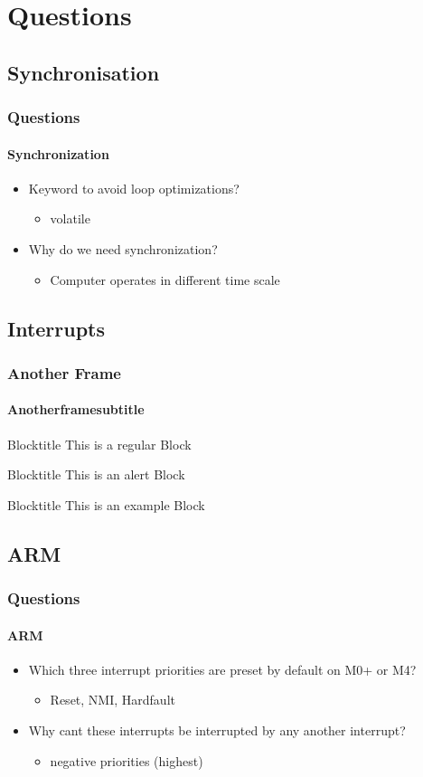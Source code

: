 \section{Questions}
\subsection{Synchronisation}
\begin{frame}
    \frametitle{Questions}
    \framesubtitle{Synchronization}
    \begin{itemize}
        \item Keyword to avoid loop optimizations?
        \begin{itemize}
        	\item volatile
        \end{itemize}
        \item Why do we need synchronization?
        \begin{itemize}
        	\item Computer operates in different time scale
        \end{itemize}
    \end{itemize}
\end{frame}

\subsection{Interrupts}
\begin{frame}
    \frametitle{Another Frame}
    \framesubtitle{Anotherframesubtitle}
    \begin{block}{Blocktitle}
        This is a regular Block
    \end{block}
    \begin{alertblock}{Blocktitle}
        This is an alert Block
    \end{alertblock}
    \begin{exampleblock}{Blocktitle}
        This is an example Block
    \end{exampleblock}
\end{frame}

\subsection{ARM}
\begin{frame}
    \frametitle{Questions}
    \framesubtitle{ARM}
    \begin{itemize}
        \item Which three interrupt priorities are preset by default on M0+ or M4?
        \begin{itemize}
        	\item Reset, NMI, Hardfault
        \end{itemize}
        \item Why cant these interrupts be interrupted by any another interrupt?
        \begin{itemize}
        	\item negative priorities (highest)
        \end{itemize}
    \end{itemize}
\end{frame}
